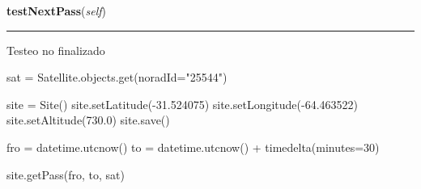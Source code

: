    \label{GroundSegment:tests:Test:testNextPass}

    \vspace{0.5ex}

\hspace{.8\funcindent}\begin{boxedminipage}{\funcwidth}

    \raggedright \textbf{testNextPass}(\textit{self})

    \vspace{-1.5ex}

    \rule{\textwidth}{0.5\fboxrule}
\setlength{\parskip}{2ex}
    Testeo no finalizado

    sat = Satellite.objects.get(noradId="25544")

    site = Site() site.setLatitude(-31.524075) 
    site.setLongitude(-64.463522) site.setAltitude(730.0) site.save()

    fro = datetime.utcnow() to = datetime.utcnow() + timedelta(minutes=30)

    site.getPass(fro, to, sat)

\setlength{\parskip}{1ex}
    \end{boxedminipage}


